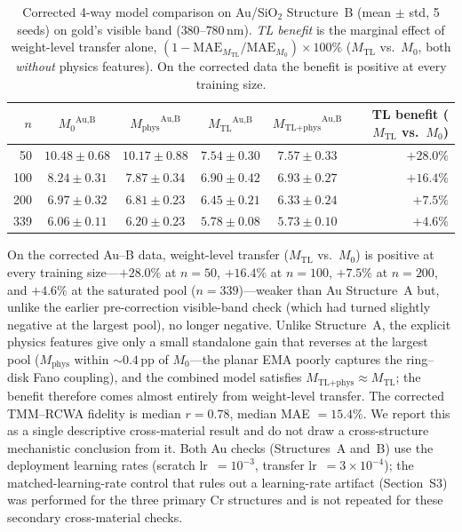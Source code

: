 \documentclass[11pt]{article}
\newcommand{\Mzero}{\ensuremath{M_0}}
\newcommand{\Mphys}{\ensuremath{M_\text{phys}}}
\newcommand{\Mtl}{\ensuremath{M_\text{TL}}}
\newcommand{\Mtlphys}{\ensuremath{M_\text{TL+phys}}}
\newcommand{\MAE}{\text{MAE}}
\begin{document}
\begin{table}[htbp]\centering\small
\caption{Corrected 4-way model comparison on Au/SiO$_2$ Structure~B (mean $\pm$ std, 5 seeds) on gold's visible band ($380$--$780$\,nm). \emph{TL benefit} is the marginal effect of weight-level transfer alone, $(1 - \MAE_{\Mtl}/\MAE_{\Mzero}) \times 100\%$ ($\Mtl$ vs.\ $\Mzero$, both \emph{without} physics features). On the corrected data the benefit is positive at every training size.}
\label{tab:material_gen_B}
\begin{tabular}{r cccc r}\toprule
$n$ & $\Mzero^\text{Au,B}$ & $\Mphys^\text{Au,B}$ & $\Mtl^\text{Au,B}$ & $\Mtlphys^\text{Au,B}$ & TL benefit ($\Mtl$ vs.\ $\Mzero$)\\\midrule
50  & $10.48 \pm 0.68$ & $10.17 \pm 0.88$ & $\mathbf{7.54 \pm 0.30}$ & $7.57 \pm 0.33$ & $+28.0\%$\\
100 & $8.24 \pm 0.31$  & $7.87 \pm 0.34$  & $\mathbf{6.90 \pm 0.42}$ & $6.93 \pm 0.27$ & $+16.4\%$\\
200 & $6.97 \pm 0.32$  & $6.81 \pm 0.23$  & $6.45 \pm 0.21$ & $\mathbf{6.33 \pm 0.24}$ & $+7.5\%$\\
339 & $6.06 \pm 0.11$  & $6.20 \pm 0.23$  & $5.78 \pm 0.08$ & $\mathbf{5.73 \pm 0.10}$ & $+4.6\%$\\\bottomrule
\end{tabular}
\end{table}

On the corrected Au--B data, weight-level transfer ($\Mtl$ vs.\ $\Mzero$) is positive at every training size---$+28.0\%$ at $n=50$, $+16.4\%$ at $n=100$, $+7.5\%$ at $n=200$, and $+4.6\%$ at the saturated pool ($n=339$)---weaker than Au Structure~A but, unlike the earlier pre-correction visible-band check (which had turned slightly negative at the largest pool), no longer negative. Unlike Structure~A, the explicit physics features give only a small standalone gain that reverses at the largest pool ($\Mphys$ within ${\sim}0.4$\,pp of $\Mzero$---the planar EMA poorly captures the ring--disk Fano coupling), and the combined model satisfies $\Mtlphys \approx \Mtl$; the benefit therefore comes almost entirely from weight-level transfer. The corrected TMM--RCWA fidelity is median $r=0.78$, median MAE $=15.4\%$. We report this as a single descriptive cross-material result and do not draw a cross-structure mechanistic conclusion from it. Both Au checks (Structures~A and~B) use the deployment learning rates (scratch lr~$=10^{-3}$, transfer lr~$=3\times10^{-4}$); the matched-learning-rate control that rules out a learning-rate artifact (Section~S3) was performed for the three primary Cr structures and is not repeated for these secondary cross-material checks.
\end{document}
